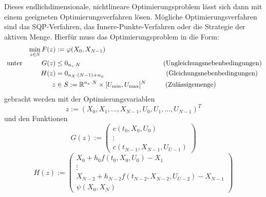 Dieses endlichdimensionale, nichtlineare Optimierungsproblem lässt sich dann mit einem geeigneten Optimierungsverfahren lösen. Mögliche Optimierungsverfahren sind das SQP-Verfahren, das Innere-Punkte-Verfahren oder die Strategie der aktiven Menge. Hierfür muss das Optimierungsproblem in die Form:
\[\begin{split}
\min_{z \in S} F(z) &:= \varphi(X_0,X_{N-1}) \\\
\text{unter} \hspace{10mm} G(z) &\leq 0_{n_s \cdot N} \hspace{43mm} \text{(Ungleichungsnebenbedingungen)} \\\
H(z) &= 0_{n_X \cdot (N-1) + n_{\psi}} \hspace{32mm} \text{(Gleichungsnebenbedingungen)}\\\
z &\in S := \R^{n_x \cdot N} \times [U_{\min},U_{\max}]^{N} \hspace{10mm} \text{(Zulässigemenge)}
\end{split} \]
gebracht werden mit der Optimierungsvariablen 
\begin{equation}
z := (X_0,X_1,...,X_{N-1},U_0,U_1,...,U_{N-1})^T
\end{equation}
und den Funktionen 
\begin{equation}
G(z) := \begin{pmatrix}
c(t_0,X_0,U_0) \\ 
\vdots \\ 
c(t_{N-1},X_{N-1},U_{U-1})
\end{pmatrix} 
\end{equation}
\begin{equation}
H(z) := \begin{pmatrix}
X_0 + h_0 f(t_0,X_0,U_0) - X_1 \\ 
\vdots \\ 
X_{N-2} + h_{N-2} f(t_{N-2},X_{N-2},U_{U-2}) - X_{N-1} \\
\psi(X_0,X_N)
\end{pmatrix} 
\end{equation}


